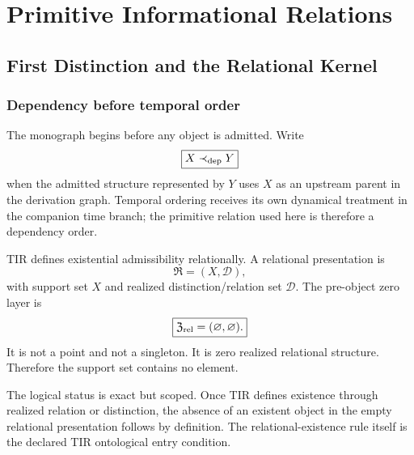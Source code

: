 \documentclass[11pt,a4paper,twoside]{book}
\theoremstyle{definition}
\begin{document}
\cleardoublepage



\tableofcontents
\mainmatter

\part{Primitive Informational Relations}

\chapter{First Distinction and the Relational Kernel}
\label{ch:v12_first_distinction}

\section{Dependency before temporal order}

The monograph begins before any object is admitted. Write
\begin{equation}
\boxed{X\prec_{\rm dep}Y}
\end{equation}
when the admitted structure represented by $Y$ uses $X$ as an upstream parent in the derivation graph. Temporal ordering receives its own dynamical treatment in the companion time branch; the primitive relation used here is therefore a dependency order.

TIR defines existential admissibility relationally. A relational presentation is
\begin{equation}
\mathfrak R=(X,\mathcal D),
\end{equation}
with support set $X$ and realized distinction/relation set $\mathcal D$. The pre-object zero layer is
\begin{equation}
\boxed{
\mathfrak Z_{\rm rel}=(\varnothing,\varnothing).
}
\label{eq:v12_relational_zero}
\end{equation}
It is not a point and not a singleton. It is zero realized relational structure. Therefore the support set contains no element.

The logical status is exact but scoped. Once TIR defines existence through realized relation or distinction, the absence of an existent object in the empty relational presentation follows by definition. The relational-existence rule itself is the declared TIR ontological entry condition.
\end{document}
